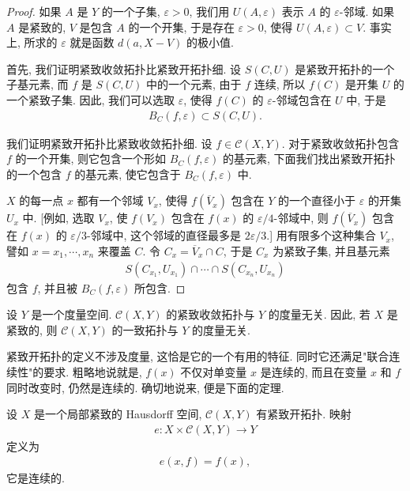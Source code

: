 \documentclass[../../main.tex]{subfiles}
\begin{document}
\begin{proof}
如果 $A$ 是 $Y$ 的一个子集, $\varepsilon>0$, 我们用 $U(A,\varepsilon)$ 表示 $A$ 的 $\varepsilon$-邻域. 如果 $A$ 是紧致的, $V$ 是包含 $A$ 的一个开集, 于是存在 $\varepsilon>0$, 使得 $U(A,\varepsilon)\subset V$. 事实上, 所求的 $\varepsilon$ 就是函数 $d(a,X-V)$ 的极小值.

首先, 我们证明紧致收敛拓扑比紧致开拓扑细. 设 $S(C,U)$ 是紧致开拓扑的一个子基元素, 而 $f$ 是 $S(C,U)$ 中的一个元素, 由于 $f$ 连续, 所以 $f(C)$ 是开集 $U$ 的一个紧致子集. 因此, 我们可以选取 $\varepsilon$, 使得 $f(C)$ 的 $\varepsilon$-邻域包含在 $U$ 中, 于是
\begin{align*}
B_C(f,\varepsilon)\subset S(C,U).
\end{align*}

我们证明紧致开拓扑比紧致收敛拓扑细. 设 $f\in\mathcal{C}(X,Y)$. 对于紧致收敛拓扑包含 $f$ 的一个开集, 则它包含一个形如 $B_C(f,\varepsilon)$ 的基元素, 下面我们找出紧致开拓扑的一个包含 $f$ 的基元素, 使它包含于 $B_C(f,\varepsilon)$ 中.

$X$ 的每一点 $x$ 都有一个邻域 $V_x$, 使得 $f(\overline{V}_x)$ 包含在 $Y$ 的一个直径小于 $\varepsilon$ 的开集 $U_x$ 中. [例如, 选取 $V_x$, 使 $f(V_x)$ 包含在 $f(x)$ 的 $\varepsilon/4$-邻域中, 则 $f(\overline{V}_x)$ 包含在 $f(x)$ 的 $\varepsilon/3$-邻域中, 这个邻域的直径最多是 $2\varepsilon/3$.] 用有限多个这种集合 $V_x$, 譬如 $x=x_1,\cdots,x_n$ 来覆盖 $C$. 令 $C_x=\overline{V}_x\cap C$, 于是 $C_x$ 为紧致子集, 并且基元素
\begin{align*}
S(C_{x_1},U_{x_1})\cap\cdots\cap S(C_{x_n},U_{x_n})
\end{align*}
包含 $f$, 并且被 $B_C(f,\varepsilon)$ 所包含.
\end{proof}

\begin{corollary}\label{corollary:ch07-compact-open-metric-independent}
设 $Y$ 是一个度量空间. $\mathcal{C}(X,Y)$ 的紧致收敛拓扑与 $Y$ 的度量无关. 因此, 若 $X$ 是紧致的, 则 $\mathcal{C}(X,Y)$ 的一致拓扑与 $Y$ 的度量无关.
\end{corollary}

紧致开拓扑的定义不涉及度量, 这恰是它的一个有用的特征. 同时它还满足"联合连续性"的要求. 粗略地说就是, $f(x)$ 不仅对单变量 $x$ 是连续的, 而且在变量 $x$ 和 $f$ 同时改变时, 仍然是连续的. 确切地说来, 便是下面的定理.

\begin{theorem}\label{theorem:ch07-evaluation-continuous}
设 $X$ 是一个局部紧致的 Hausdorff 空间, $\mathcal{C}(X,Y)$ 有紧致开拓扑. 映射
\begin{align*}
e\colon X\times\mathcal{C}(X,Y)\longrightarrow Y
\end{align*}
定义为
\begin{align*}
e(x,f)=f(x),
\end{align*}
它是连续的.
\end{theorem}
\end{document}
